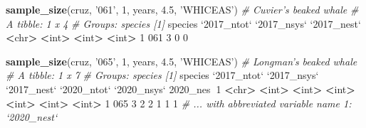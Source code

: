 \documentclass[
]{book}
\newenvironment{Shaded}{\begin{snugshade}}{\end{snugshade}}
\newcommand{\CommentTok}[1]{\textcolor[rgb]{0.56,0.35,0.01}{\textit{#1}}}
\newcommand{\DataTypeTok}[1]{\textcolor[rgb]{0.13,0.29,0.53}{#1}}
\newcommand{\DecValTok}[1]{\textcolor[rgb]{0.00,0.00,0.81}{#1}}
\newcommand{\ErrorTok}[1]{\textcolor[rgb]{0.64,0.00,0.00}{\textbf{#1}}}
\newcommand{\FloatTok}[1]{\textcolor[rgb]{0.00,0.00,0.81}{#1}}
\newcommand{\KeywordTok}[1]{\textcolor[rgb]{0.13,0.29,0.53}{\textbf{#1}}}
\newcommand{\NormalTok}[1]{#1}
\newcommand{\OperatorTok}[1]{\textcolor[rgb]{0.81,0.36,0.00}{\textbf{#1}}}
\newcommand{\StringTok}[1]{\textcolor[rgb]{0.31,0.60,0.02}{#1}}
\begin{document}
\begin{Shaded}
\begin{Highlighting}[]
\KeywordTok{sample_size}\NormalTok{(cruz, }\StringTok{'061'}\NormalTok{, }\DecValTok{1}\NormalTok{, years, }\FloatTok{4.5}\NormalTok{, }\StringTok{'WHICEAS'}\NormalTok{) }\CommentTok{# Cuvier's beaked whale}
\CommentTok{# A tibble: 1 x 4}
\CommentTok{# Groups:   species [1]}
\NormalTok{  species }\StringTok{`}\DataTypeTok{2017_ntot}\StringTok{`} \StringTok{`}\DataTypeTok{2017_nsys}\StringTok{`} \StringTok{`}\DataTypeTok{2017_nest}\StringTok{`}
  \OperatorTok{<}\NormalTok{chr}\OperatorTok{>}\StringTok{         }\ErrorTok{<}\NormalTok{int}\OperatorTok{>}\StringTok{       }\ErrorTok{<}\NormalTok{int}\OperatorTok{>}\StringTok{       }\ErrorTok{<}\NormalTok{int}\OperatorTok{>}
\DecValTok{1} \DecValTok{061}               \DecValTok{3}           \DecValTok{0}           \DecValTok{0}

\KeywordTok{sample_size}\NormalTok{(cruz, }\StringTok{'065'}\NormalTok{, }\DecValTok{1}\NormalTok{, years, }\FloatTok{4.5}\NormalTok{, }\StringTok{'WHICEAS'}\NormalTok{) }\CommentTok{# Longman's beaked whale}
\CommentTok{# A tibble: 1 x 7}
\CommentTok{# Groups:   species [1]}
\NormalTok{  species }\StringTok{`}\DataTypeTok{2017_ntot}\StringTok{`} \StringTok{`}\DataTypeTok{2017_nsys}\StringTok{`} \StringTok{`}\DataTypeTok{2017_nest}\StringTok{`} \StringTok{`}\DataTypeTok{2020_ntot}\StringTok{`} \StringTok{`}\DataTypeTok{2020_nsys}\StringTok{`} \DecValTok{2020}\NormalTok{_nes}\OperatorTok{~}\DecValTok{1}
  \OperatorTok{<}\NormalTok{chr}\OperatorTok{>}\StringTok{         }\ErrorTok{<}\NormalTok{int}\OperatorTok{>}\StringTok{       }\ErrorTok{<}\NormalTok{int}\OperatorTok{>}\StringTok{       }\ErrorTok{<}\NormalTok{int}\OperatorTok{>}\StringTok{       }\ErrorTok{<}\NormalTok{int}\OperatorTok{>}\StringTok{       }\ErrorTok{<}\NormalTok{int}\OperatorTok{>}\StringTok{      }\ErrorTok{<}\NormalTok{int}\OperatorTok{>}
\DecValTok{1} \DecValTok{065}               \DecValTok{3}           \DecValTok{2}           \DecValTok{2}           \DecValTok{1}           \DecValTok{1}          \DecValTok{1}
\CommentTok{# ... with abbreviated variable name 1: `2020_nest`}


\end{Highlighting}
\end{Shaded}
\end{document}
